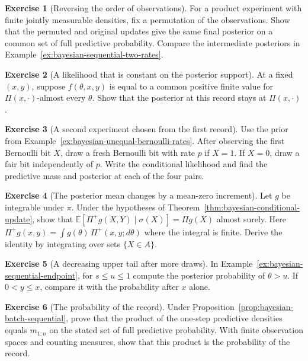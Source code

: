 \documentclass[11pt,oneside]{book}
\theoremstyle{definition}
\newtheorem{exercise}{Exercise}[section]
\theoremstyle{remark}
\begin{document}
\begin{exercise}[Reversing the order of observations]
\label{exer:bayesian-sequential-order}
For a product experiment with finite jointly measurable densities,
fix a permutation of the observations. Show that the permuted and
original updates give the same final posterior on a common set
of full predictive probability. Compare the intermediate
posteriors in Example~\ref{ex:bayesian-sequential-two-rates}.
\end{exercise}

\begin{exercise}[A likelihood that is constant on the posterior support]
\label{exer:bayesian-sequential-constant-likelihood}
At a fixed $(x,y)$, suppose $f(\theta,x,y)$ is equal to a common
positive finite value for $\Pi(x,\cdot)$-almost every $\theta$.
Show that the posterior at this record stays at $\Pi(x,\cdot)$.
\end{exercise}

\begin{exercise}[A second experiment chosen from the first record]
\label{exer:bayesian-sequential-adaptive-experiment}
Use the prior from Example~\ref{ex:bayesian-unequal-bernoulli-rates}.
After observing the first Bernoulli bit $X$, draw a fresh
Bernoulli bit with rate $p$ if $X=1$. If $X=0$, draw a fair bit
independently of $p$. Write the conditional likelihood and find
the predictive mass and posterior at each of the four pairs.
\end{exercise}

\begin{exercise}[The posterior mean changes by a mean-zero increment]
\label{exer:bayesian-sequential-mean-increment}
Let $g$ be integrable under $\pi$. Under the hypotheses of
Theorem~\ref{thm:bayesian-conditional-update}, show that
$\mathbb E[\Pi^+g(X,Y)\mid \sigma(X)]=\Pi g(X)$ almost surely.
Here $\Pi^+g(x,y)=\int g(\theta)\,\Pi^+(x,y;d\theta)$ where
the integral is finite. Derive the identity by integrating over
sets $\{X\in A\}$.
\end{exercise}

\begin{exercise}[A decreasing upper tail after more draws]
\label{exer:bayesian-sequential-endpoint-tail}
In Example~\ref{ex:bayesian-sequential-endpoint}, for
$s\leq u\leq1$ compute the posterior probability of $\theta>u$.
If $0<y\leq x$, compare it with the probability after $x$ alone.
\end{exercise}

\begin{exercise}[The probability of the record]
\label{exer:bayesian-sequential-predictive-product}
Under Proposition~\ref{prop:bayesian-batch-sequential}, prove that the
product of the one-step predictive densities equals $m_{1:n}$
on the stated set of full predictive probability. With finite observation spaces and counting measures, show that
this product is the probability of the record.
\end{exercise}
\end{document}
